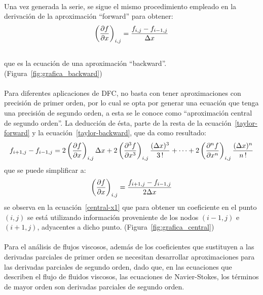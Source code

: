 \documentclass[letterpaper, openright, 12pt]{book}
\begin{document}
\paragraph{}
    Una vez generada la serie, se sigue el mismo procedimiento empleado en la
    derivación de la aproximación ``forward'' para obtener:
    \begin{equation}
    \left( \pdv{f}{x} \right)_{i,j} = \frac{f_{i,j} - f_{i-1,j}}{\Delta x}
    \label{backward-x1}
    \end{equation}
    \\que es la ecuación de una aproximación ``backward''. (Figura~\ref{fig:grafica_backward})

    \paragraph*{}
    Para diferentes aplicaciones de DFC, no basta con tener aproximaciones con
    precisión de primer orden, por lo cual se opta por generar una ecuación que
    tenga una precisión de segundo orden, a esta se le conoce como
    ``aproximación central de segundo orden''. La deducción de ésta, parte de la
    resta de la ecuación~\ref{taylor-forward} y la ecuación~\ref{taylor-backward},
    que da como resultado:
    \begin{equation}
    f_{i+1,j} - f_{i-1, j} = 2 \left( \pdv{f}{x} \right)_{i,j} \Delta x + 2 \left( \pdv[3]{f}{x} \right)_{i,j} \frac{(\Delta x)^3}{3 \,!} + \dotsb + 2 \left( \pdv[n]{f}{x} \right)_{i,j} \frac{(\Delta x)^n}{n\,!}
    \end{equation}
    que se puede simplificar a:\\
    \begin{equation}
    \left( \pdv{f}{x} \right)_{i,j} = \frac{f_{i+1,j} - f_{i-1,j}}{2 \Delta x}
    \label{central-x1}
    \end{equation}
    se observa en la ecuación~\ref{central-x1} que para obtener un coeficiente
    en el punto $(i,j)$ se está utilizando información proveniente de los nodos
    $(i-1, j)$ e $(i+1, j)$, adyacentes a dicho punto. (Figura~\ref{fig:grafica_central})

    \paragraph*{}
    Para el análisis de flujos viscosos, además de los coeficientes que sustituyen
    a las derivadas parciales de primer orden se necesitan desarrollar
    aproximaciones para las derivadas parciales de segundo orden, dado que, en
    las ecuaciones que describen el flujo de fluidos viscosos, las ecuaciones de
    Navier-Stokes, los términos de mayor orden son derivadas parciales de
    segundo orden.
\end{document}
